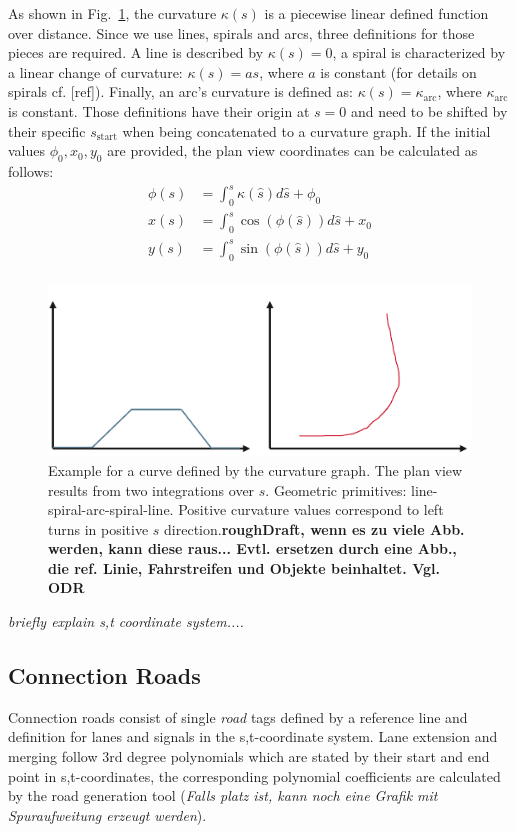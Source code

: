 \documentclass[a4paper, 10pt, conference]{ieeeconf}      %
\begin{document}
As shown in Fig.~\ref{fig_curvGraph}, the curvature $\kappa(s)$ is a piecewise linear defined function over distance. Since we use lines, spirals and arcs, three definitions for those pieces are required. A line is described by $\kappa(s) = 0$, a spiral is characterized by a linear change of curvature: $\kappa(s) = a s$, where $a$ is constant (for details on spirals cf. [ref]). Finally, an arc's curvature is defined as: $\kappa(s) = \kappa_\text{arc}$, where $\kappa_\text{arc}$ is constant. Those definitions have their origin at $s=0$ and need to be shifted by their specific $s_\text{start}$ when being concatenated to a curvature graph. If the initial values $\phi_\text{0}, x_\text{0}, y_\text{0}$ are provided, the plan view coordinates can be calculated as follows:
\begin{equation} \label{eq1}
\begin{split}
\phi(s) &= \int_0^s \kappa(\hat{s}) d\hat{s} + \phi_\text{0} \\ 
x(s) &= \int_{0}^{s} \cos(\phi(\hat{s})) d\hat{s} + x_\text{0} \\ 
y(s) &= \int_{0}^{s} \sin(\phi(\hat{s})) d\hat{s} + y_\text{0} \\
\end{split}
\end{equation}
\begin{figure}%
	\centering
	\includegraphics{fig/curvGraph.pdf}
	\caption{Example for a curve defined by the curvature graph. The plan view results from two integrations over $s$. Geometric primitives: line-spiral-arc-spiral-line. Positive curvature values correspond to left turns in positive $s$ direction.\textbf{roughDraft, wenn es zu viele Abb. werden, kann diese raus... Evtl. ersetzen durch eine Abb., die ref. Linie, Fahrstreifen und Objekte beinhaltet. Vgl. ODR}}
	\label{fig_curvGraph}
\end{figure}
\textit{briefly explain s,t coordinate system....}

\subsection{Connection Roads}
Connection roads consist of single \textit{road} tags defined by a reference line and definition for lanes and signals in the s,t-coordinate system. Lane extension and merging follow 3rd degree polynomials which are stated by their start and end point in s,t-coordinates, the corresponding polynomial coefficients are calculated by the road generation tool (\textit{Falls platz ist, kann noch eine Grafik mit Spuraufweitung erzeugt werden}).
\end{document}
